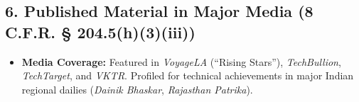 \documentclass[11pt,a4paper]{article}
\begin{document}
\subsection*{6. Published Material in Major Media (8 C.F.R. § 204.5(h)(3)(iii))}
\begin{itemize}
    \item \textbf{Media Coverage:} Featured in \textit{VoyageLA} (``Rising Stars''), \textit{TechBullion}, \textit{TechTarget}, and \textit{VKTR}. Profiled for technical achievements in major Indian regional dailies (\textit{Dainik Bhaskar}, \textit{Rajasthan Patrika}).
\end{itemize}
\end{document}
